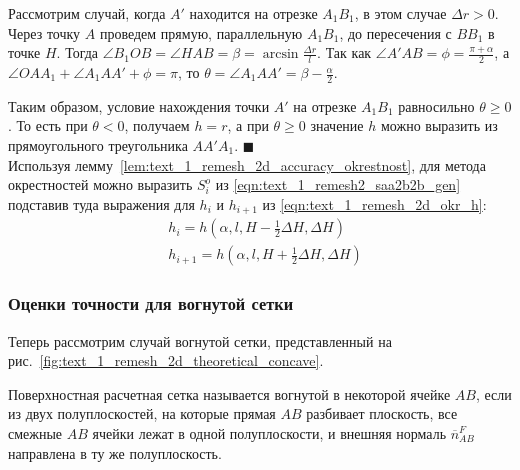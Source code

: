 Рассмотрим случай, когда $A'$ находится на отрезке $A_1B_1$, в этом случае $\Delta r > 0$.
Через точку $A$ проведем прямую, параллельную $A_1B_1$, до пересечения с $BB_1$ в точке $H$.
Тогда $\angle B_1OB = \angle HAB = \beta = \arcsin \frac{\Delta r}{l}$.
Так как $\angle A'AB = \phi = \frac{\pi + \alpha}{2}$, а $\angle OAA_1 + \angle A_1AA' + \phi = \pi$, то $\theta = \angle A_1AA' = \beta - \frac{\alpha}{2}$.

Таким образом, условие нахождения точки $A'$ на отрезке $A_1B_1$ равносильно $\theta \ge 0$.
То есть при $\theta < 0$, получаем $h = r$, а при $\theta \ge 0$ значение $h$ можно выразить из прямоугольного треугольника $AA'A_1$.
$\blacksquare$\\

Используя лемму~\ref{lem:text_1_remesh_2d_accuracy_okrestnost}, для метода окрестностей можно выразить $S_i^o$ из \eqref{eqn:text_1_remesh2_saa2b2b_gen} подставив туда выражения для $h_i$ и $h_{i + 1}$ из \eqref{eqn:text_1_remesh_2d_okr_h}:
\begin{equation}
	\begin{aligned}
	& h_i = h \left( \alpha, l, H - \frac{1}{2}\Delta H, \Delta H \right) \\
	& h_{i + 1} = h \left( \alpha, l, H + \frac{1}{2}\Delta H, \Delta H \right)
	\end{aligned}
\end{equation}

\subsubsection{Оценки точности для вогнутой сетки}

Теперь рассмотрим случай вогнутой сетки, представленный на рис.~\ref{fig:text_1_remesh_2d_theoretical_concave}.

\begin{definition}
Поверхностная расчетная сетка называется вогнутой в некоторой ячейке $AB$, если из двух полуплоскостей, на которые прямая $AB$ разбивает плоскость, все смежные $AB$ ячейки лежат в одной полуплоскости, и внешняя нормаль $\overline{n}_{AB}^F$ направлена в ту же полуплоскость.
\end{definition}

